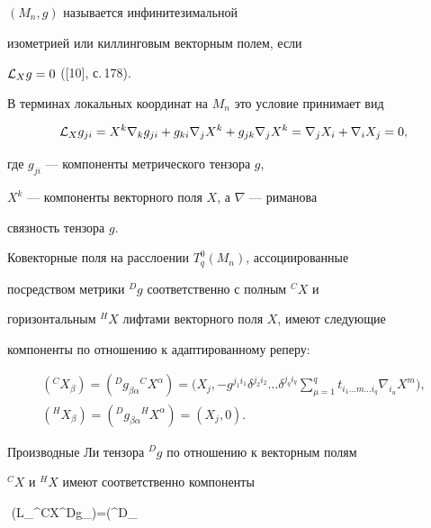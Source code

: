 $(M_n, g)$ называется инфинитезимальной


изометрией или киллинговым векторным полем, если


${\cal L}_X g=0$ ([10], с.\,178).


В терминах локальных координат на $M_n$ это условие принимает вид


$$


{\cal L}_X g_{ji}=X^{k}\nabla_{k} g_{ji}+


g_{{k} i}\nabla_j X^{k}+g_{j{k}}\nabla_j


X^{k}=\nabla_j X_i+\nabla_i X_j=0,


$$


где $g_{ji}$ --- компоненты метрического тензора $g$,


$X^{k}$ --- компоненты векторного поля $X$, а $\nabla$ --- риманова


связность тензора  $g$.





Ковекторные поля на расслоении $T^0_q(M_n)$, ассоциированные


посредством метрики ${}^Dg$ соответственно с полным ${}^CX$ и


горизонтальным ${}^HX$ лифтами векторного поля $X$, имеют следующие


компоненты по отношению к адаптированному реперу:


$$


\begin{array}{c}


({}^CX_\beta)=({}^Dg_{\beta\alpha}{}^CX^\alpha)=


\bigg(X_j,-g^{j_1i_1}\delta^{j_2i_2}\dotsc \delta^{j_q i_q}


\displaystyle\sum^q_{\mu=1}t_{i_1\dotsc m\dotsc i_q}


\nabla_{i_u}X^m\bigg),\\[3mm]


%


({}^HX_\beta)=({}^Dg_{\beta\alpha}{}^HX^\alpha)=(X_j,0).


\end{array}


$$





Производные Ли тензора ${}^Dg$ по отношению к векторным полям


${}^CX$ и ${}^HX$ имеют соответственно компоненты


$$
({\cal L}_{{}^CX}{}^Dg_{\beta\alpha})=({}^D\nabla_\beta


